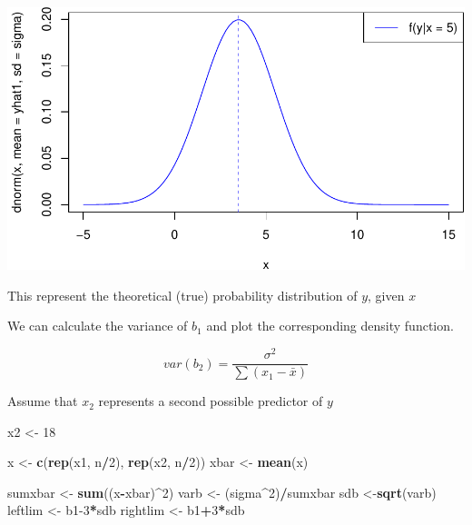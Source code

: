 \documentclass[]{book}
\newenvironment{Shaded}{\begin{snugshade}}{\end{snugshade}}
\newcommand{\DecValTok}[1]{\textcolor[rgb]{0.00,0.00,0.81}{#1}}
\newcommand{\KeywordTok}[1]{\textcolor[rgb]{0.13,0.29,0.53}{\textbf{#1}}}
\newcommand{\NormalTok}[1]{#1}
\newcommand{\OperatorTok}[1]{\textcolor[rgb]{0.81,0.36,0.00}{\textbf{#1}}}
\newcommand{\StringTok}[1]{\textcolor[rgb]{0.31,0.60,0.02}{#1}}
\begin{document}
\includegraphics{MEM5220_R_files/figure-latex/unnamed-chunk-33-1.pdf}

This represent the theoretical (true) probability distribution of \(y\),
given \(x\)

We can calculate the variance of \(b_{1}\) and plot the corresponding
density function.

\begin{equation}
var(b_2) = \frac{\sigma^2}{\sum{}{}(x_1 - \bar{x})}
\label{eq:variancebeta}
\end{equation}

Assume that \(x_{2}\) represents a second possible predictor of \(y\)

\begin{Shaded}
\begin{Highlighting}[]
\NormalTok{x2 <-}\StringTok{ }\DecValTok{18}

\NormalTok{x <-}\StringTok{ }\KeywordTok{c}\NormalTok{(}\KeywordTok{rep}\NormalTok{(x1, n}\OperatorTok{/}\DecValTok{2}\NormalTok{), }\KeywordTok{rep}\NormalTok{(x2, n}\OperatorTok{/}\DecValTok{2}\NormalTok{))}
\NormalTok{xbar <-}\StringTok{ }\KeywordTok{mean}\NormalTok{(x)}

\NormalTok{sumxbar <-}\StringTok{ }\KeywordTok{sum}\NormalTok{((x}\OperatorTok{-}\NormalTok{xbar)}\OperatorTok{^}\DecValTok{2}\NormalTok{)}
\NormalTok{varb <-}\StringTok{ }\NormalTok{(sigma}\OperatorTok{^}\DecValTok{2}\NormalTok{)}\OperatorTok{/}\NormalTok{sumxbar}
\NormalTok{sdb <-}\KeywordTok{sqrt}\NormalTok{(varb)}
\NormalTok{leftlim <-}\StringTok{ }\NormalTok{b1}\DecValTok{-3}\OperatorTok{*}\NormalTok{sdb}
\NormalTok{rightlim <-}\StringTok{ }\NormalTok{b1}\OperatorTok{+}\DecValTok{3}\OperatorTok{*}\NormalTok{sdb}
\end{Highlighting}
\end{Shaded}
\end{document}

